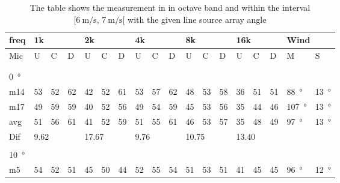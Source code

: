 \begin{table}[H]
\centering
\caption{The table shows the measurement in in octave band and within the interval $[\SI{6}{\meter\per\second},\, \SI{7}{\meter\per\second}[ $ with the given line source array angle}
\setlength\tabcolsep{5pt} %
\begin{tabular}{l|l|l|l|l|l|l|l|l|l|l|l|l|l|l|l|l|l}
freq & \multicolumn{3}{l|}{1k} & \multicolumn{3}{l|}{2k} & \multicolumn{3}{l|}{4k} & \multicolumn{3}{l|}{8k} & \multicolumn{3}{l|}{16k}   &  \multicolumn{2}{l}{Wind}                      \\ \hline
Mic  & U      & C      & D     & U      & C      & D     & U      & C      & D     & U      & C      & D     & U  & C  & D & M &S \\ \hline
 & \multicolumn{3}{l|}{} & \multicolumn{3}{l|}{} & \multicolumn{3}{l|}{} & \multicolumn{3}{l|}{} & \multicolumn{3}{l|}{} &      \multicolumn{2}{l}{}                        \\ 
 \multicolumn{18}{l}{ } \\   
\SI{0}{\degree}   & \multicolumn{3}{l|}{} & \multicolumn{3}{l|}{} & \multicolumn{3}{l|}{} & \multicolumn{3}{l|}{} &  \multicolumn{3}{l|}{} &   \multicolumn{2}{l}{}   \\  \hline
m14  & 53     & 52     & 62    & 42     & 52     & 61    & 53     & 57     & 62    & 48     & 53     & 58    & 36 & 51 & 51 & \SI{88}{\degree} & \SI{13}{\degree}   \\
m17  & 49     & 59     & 59    & 40     & 52     & 56    & 49     & 54     & 59    & 45     & 53     & 56    & 35 & 44 & 46 &\SI{107}{\degree} & \SI{13}{\degree}  \\ \hline
avg  &   51    &   56   & 61    &  41    &  52    &  59  &   51     &  55   &   61  &  46    & 53    &  57     & 35   & 48   & 49 & \SI{97}{\degree} & \SI{13}{\degree} \\ \hline  
Dif & \multicolumn{3}{l|}{9.62} & \multicolumn{3}{l|}{17.67} & \multicolumn{3}{l|}{9.76} & \multicolumn{3}{l|}{10.75} &  \multicolumn{3}{l|}{13.40} &  \multicolumn{2}{l}{}  \\ 
 \multicolumn{18}{l}{ } \\                             
\SI{10}{\degree}   & \multicolumn{3}{l|}{} & \multicolumn{3}{l|}{} & \multicolumn{3}{l|}{} & \multicolumn{3}{l|}{} &  \multicolumn{3}{l|}{}  &  \multicolumn{2}{l}{} \\  \hline
m5    & 54     & 52     & 51     &  45    & 50     &  44    &  52    & 55      &  54    &    51   &  53    &  51    & 41 & 45 & 45 &  \SI{96}{\degree} & \SI{12}{\degree} \\ 

\end{tabular}
\end{table}
